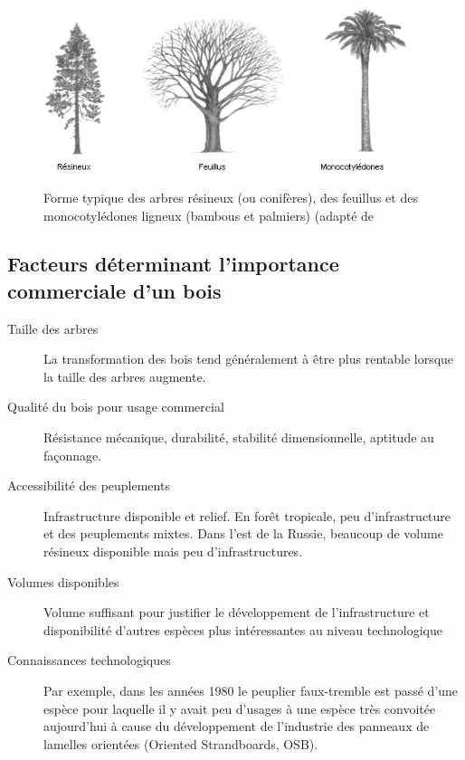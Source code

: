 \begin{figure}[ht]
\centering
\includegraphics[scale=0.9]{img/ch2_types_arbres}
\caption{Forme typique des arbres résineux (ou conifères), des feuillus et des monocotylédones ligneux (bambous et palmiers) (adapté de \cite{hoadley1990identifying}}
\label{types_arbres}
\end{figure}

\subsection{Facteurs déterminant l'importance commerciale d'un bois}

\begin{description}
\item[Taille des arbres] La transformation des bois tend généralement à être plus rentable lorsque la taille des arbres augmente. 
\item[Qualité du bois pour usage commercial] Résistance mécanique, durabilité, stabilité dimensionnelle, aptitude au façonnage. 
\item[Accessibilité des peuplements] Infrastructure disponible et relief. En forêt tropicale, peu d'infrastructure et des peuplements mixtes. Dans l'est de la Russie, beaucoup de volume résineux disponible mais peu d'infrastructures.
\item[Volumes disponibles] Volume suffisant pour justifier le développement de l'infrastructure et disponibilité d'autres espèces plus intéressantes au niveau technologique 
\item[Connaissances technologiques] Par exemple, dans les années 1980 le peuplier faux-tremble est passé d'une espèce pour laquelle il y avait peu d'usages à une espèce très convoitée aujourd'hui à cause du développement de l'industrie des panneaux de lamelles orientées (Oriented Strandboards, OSB). 
\end{description}

